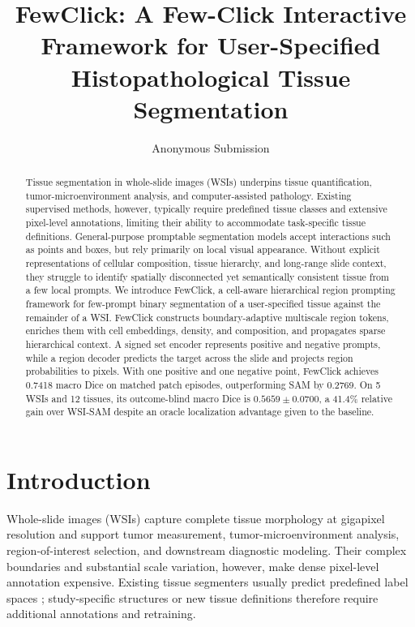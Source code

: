 \documentclass[letterpaper]{article}
\title{FewClick: A Few-Click Interactive Framework for User-Specified Histopathological Tissue Segmentation}
\author{Anonymous Submission}
\begin{document}
\maketitle

\begin{abstract}
Tissue segmentation in whole-slide images (WSIs) underpins tissue quantification, tumor-microenvironment analysis, and computer-assisted pathology. Existing supervised methods, however, typically require predefined tissue classes and extensive pixel-level annotations, limiting their ability to accommodate task-specific tissue definitions. General-purpose promptable segmentation models accept interactions such as points and boxes, but rely primarily on local visual appearance. Without explicit representations of cellular composition, tissue hierarchy, and long-range slide context, they struggle to identify spatially disconnected yet semantically consistent tissue from a few local prompts. We introduce FewClick, a cell-aware hierarchical region prompting framework for few-prompt binary segmentation of a user-specified tissue against the remainder of a WSI. FewClick constructs boundary-adaptive multiscale region tokens, enriches them with cell embeddings, density, and composition, and propagates sparse hierarchical context. A signed set encoder represents positive and negative prompts, while a region decoder predicts the target across the slide and projects region probabilities to pixels. With one positive and one negative point, FewClick achieves 0.7418 macro Dice on matched patch episodes, outperforming SAM by 0.2769. On 5 WSIs and 12 tissues, its outcome-blind macro Dice is $0.5659\pm0.0700$, a 41.4\% relative gain over WSI-SAM despite an oracle localization advantage given to the baseline.
\end{abstract}

\section{Introduction}
Whole-slide images (WSIs) capture complete tissue morphology at gigapixel resolution and support tumor measurement, tumor-microenvironment analysis, region-of-interest selection, and downstream diagnostic modeling. Their complex boundaries and substantial scale variation, however, make dense pixel-level annotation expensive. Existing tissue segmenters usually predict predefined label spaces \cite{chan2019histosegnet,xu2019camel,tokunaga2019awmf,vanrijthoven2021hooknet}; study-specific structures or new tissue definitions therefore require additional annotations and retraining.
\end{document}
